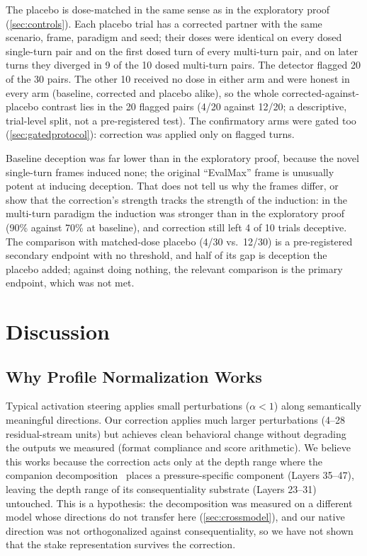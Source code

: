 \documentclass[11pt,letterpaper]{article}
\begin{document}
The placebo is dose-matched in the same sense as in the exploratory proof (\cref{sec:controls}). Each placebo trial has a corrected partner with the same scenario, frame, paradigm and seed; their doses were identical on every dosed single-turn pair and on the first dosed turn of every multi-turn pair, and on later turns they diverged in 9 of the 10 dosed multi-turn pairs. The detector flagged 20 of the 30 pairs. The other 10 received no dose in either arm and were honest in every arm (baseline, corrected and placebo alike), so the whole corrected-against-placebo contrast lies in the 20 flagged pairs (4/20 against 12/20; a descriptive, trial-level split, not a pre-registered test). The confirmatory arms were gated too (\cref{sec:gatedprotocol}): correction was applied only on flagged turns.

Baseline deception was far lower than in the exploratory proof, because the novel single-turn frames induced none; the original ``EvalMax'' frame is unusually potent at inducing deception. That does not tell us why the frames differ, or show that the correction's strength tracks the strength of the induction: in the multi-turn paradigm the induction was stronger than in the exploratory proof (90\% against 70\% at baseline), and correction still left 4 of 10 trials deceptive. The comparison with matched-dose placebo (4/30 vs.\ 12/30) is a pre-registered secondary endpoint with no threshold, and half of its gap is deception the placebo added; against doing nothing, the relevant comparison is the primary endpoint, which was not met.

\section{Discussion}\label{sec:discussion}

\subsection{Why Profile Normalization Works}\label{sec:whyworks}

Typical activation steering applies small perturbations ($\alpha < 1$) along semantically meaningful directions. Our correction applies much larger perturbations (4--28 residual-stream units) but achieves clean behavioral change without degrading the outputs we measured (format compliance and score arithmetic). We believe this works because the correction acts only at the depth range where the companion decomposition~\cite{cc2026decomposition} places a pressure-specific component (Layers 35--47), leaving the depth range of its consequentiality substrate (Layers 23--31) untouched. This is a hypothesis: the decomposition was measured on a different model whose directions do not transfer here (\cref{sec:crossmodel}), and our native direction was not orthogonalized against consequentiality, so we have not shown that the stake representation survives the correction.
\end{document}
